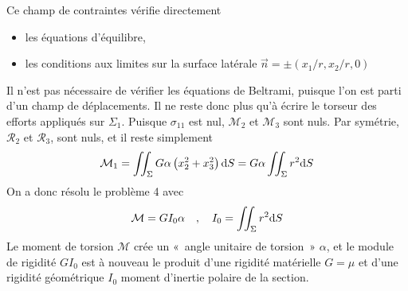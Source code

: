 Ce champ de contraintes vérifie directement
\begin{itemize}
    \item les équations d'équilibre,
    \item les conditions aux limites sur la surface latérale $\vec{n} = \pm \left( x_1/r, x_2/r, 0 \right)$
\end{itemize}
Il n'est pas nécessaire de vérifier les équations de  Beltrami,  puisque l'on est parti d'un champ de déplacements.
Il ne reste donc plus qu'à écrire le torseur des efforts appliqués sur $\Sigma_1$.
Puisque $\sigma_{11}$ est nul, $\mathcal{M}_2$ et $\mathcal{M}_3$ sont nuls.
Par symétrie, $\mathcal{R}_2$ et $\mathcal{R}_3$, sont nuls, et il reste simplement
\begin{equation}
    \mathcal{M}_1 = \iint_{\Sigma} G \alpha \left( x_2^2 + x_3^2 \right) \mathrm{d} S = G\alpha \iint_{\Sigma} r^2 \mathrm{d} S    
    \label{eq:Ch07-040} 
\end{equation}
On a donc résolu le problème 4 avec
\begin{equation}
    \mathcal{M} = G I_0 \alpha \quad,\quad I_0 = \iint_{\Sigma} r^2 \mathrm{d} S
    \label{eq:Ch07-041}
\end{equation}
Le moment de torsion $\mathcal{M}$ crée un «~angle unitaire de torsion~» $\alpha$, et le module de rigidité $G I_0$ est à nouveau le produit d'une rigidité matérielle $G=\mu$ et d'une rigidité géométrique $I_0$ moment d'inertie polaire de la section.


